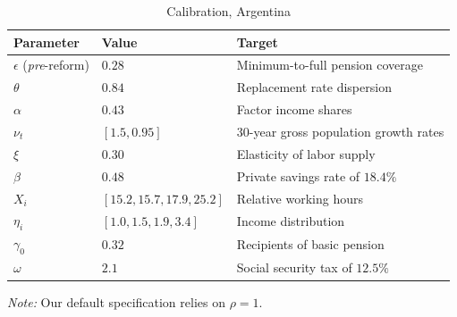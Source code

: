 \begin{table}[!htb]
\centering
\begin{threeparttable}
\caption{Calibration, Argentina}
\label{table:Arg:Calib}
\begin{tabular}{lll}
\toprule
\textbf{Parameter} & \textbf{Value} & \textbf{Target} \\
\midrule 
$\epsilon$ (\textit{pre}-reform) & $0.28$ & Minimum-to-full pension coverage \\[1ex]
$\theta$ & $0.84$ & Replacement rate dispersion \\[1ex]
$\alpha$ & $0.43$ & Factor income shares \\[1ex]
$\nu_t$ & $[1.5, 0.95]$ & 30-year gross population growth rates \\[1ex]
$\xi$ & 0.30 & Elasticity of labor supply \\[1ex]
$\beta$ & $0.48$ & Private savings rate of $18.4\%$ \\[1ex]
$X_i$ & $[15.2, 15.7, 17.9, 25.2]$ & Relative working hours \\[1ex]
$\eta_i$ & $[1.0, 1.5, 1.9, 3.4]$ & Income distribution \\[1ex]
$\gamma_0$ & $0.32$ & Recipients of basic pension \\[1ex]
$\omega$ & $2.1$ & Social security tax of $12.5\%$ \\[1ex]
\bottomrule
\end{tabular}
\begin{tablenotes}
\footnotesize
\item \textit{Note:} Our default specification relies on $\rho=1$.  
\end{tablenotes}
\end{threeparttable}
\end{table}